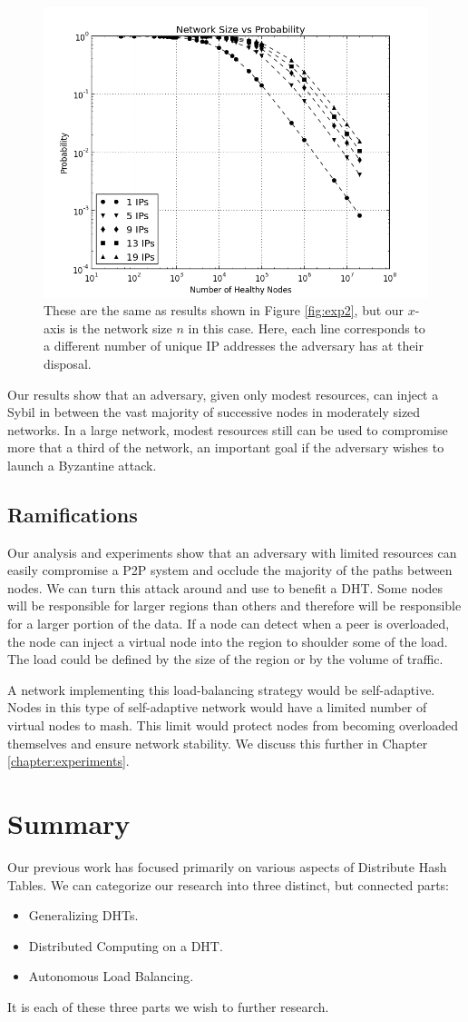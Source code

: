 \begin{figure}
	\centering
	\includegraphics[width=0.5\linewidth]{figs/size_prob_all}
	\caption[a]{These are the same as results shown in Figure \ref{fig:exp2}, but our $x$-axis is the network size $n$ in this case.  
		Here, each line corresponds to a different number of unique IP addresses the adversary has at their disposal.}
	\label{fig:size_prob_all}
\end{figure}


Our results show that an adversary, given only modest resources, can inject a Sybil in between the vast majority of successive nodes in moderately sized networks.
In a large network, modest resources still can be used to compromise more that a third of the network, an  important goal if the adversary  wishes to launch a Byzantine attack.

\subsection{Ramifications}
Our analysis and experiments show that an adversary with limited resources can easily compromise a P2P system and occlude the majority of the paths between nodes.
We can turn this attack around and use to benefit a DHT.
Some nodes will be responsible for larger regions than others and therefore will be responsible for a larger portion of the data.
If a node can detect when a peer is overloaded, the node can inject a virtual node into the region to shoulder some of the load.
The load could be defined by the size of the region or by the volume of traffic.

A network implementing this load-balancing strategy would be self-adaptive.
Nodes in this type of self-adaptive network would have a limited number of virtual nodes to mash.
This limit would protect nodes from becoming overloaded themselves and ensure network stability.
We discuss this further in Chapter \ref{chapter:experiments}.

\section{Summary}
Our previous work has focused primarily on various aspects of Distribute Hash Tables.
We can categorize our research into three distinct, but connected parts:
\begin{itemize}
	\item Generalizing DHTs.
	\item Distributed Computing on a DHT.
	\item Autonomous Load Balancing.
\end{itemize}
It is each of these three parts we wish to further research.